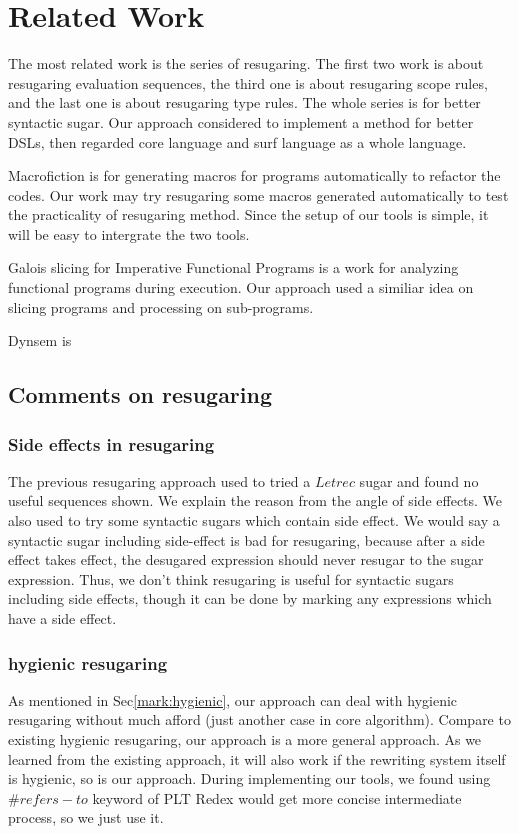 \section{Related Work}
\label{sec5}

The most related work is the series of resugaring\cite{resugaring,hygienic,resugaringtype,resugaringscope}. The first two work is about resugaring evaluation sequences, the third one is about resugaring scope rules, and the last one is about resugaring type rules. The whole series is for better syntactic sugar. Our approach considered to implement a method for better DSLs, then regarded core language and surf language as a whole language.

Macrofiction\cite{Macrofication} is for generating macros for programs automatically to refactor the codes. Our work may try resugaring some macros generated automatically to test the practicality of resugaring method. Since the setup of our tools is simple, it will be easy to intergrate the two tools.

Galois slicing for Imperative Functional Programs\cite{slicing} is a work for analyzing functional programs during execution. Our approach used a similiar idea on slicing programs and processing on sub-programs.

Dynsem\cite{dynsem} is 

\subsection{Comments on resugaring}

\subsubsection{Side effects in resugaring}
\label{mark:side}
The previous resugaring approach used to tried a $Letrec$ sugar and found no useful sequences shown. We explain the reason from the angle of side effects. We also used to try some syntactic sugars which contain side effect. We would say a syntactic sugar including side-effect is bad for resugaring, because after a side effect takes effect, the desugared expression should never resugar to the sugar expression. Thus, we don't think resugaring is useful for syntactic sugars  including side effects, though it can be done by marking any expressions which have a side effect.

\subsubsection{hygienic resugaring}As mentioned in Sec\ref{mark:hygienic}, our approach can deal with hygienic resugaring without much afford (just another case in core algorithm). Compare to existing hygienic resugaring\cite{hygienic}, our approach is a more general approach. As we learned from the existing approach, it will also work if the rewriting system itself is hygienic, so is our approach. During implementing our tools, we found using $\#refers-to$ keyword of PLT Redex would get more concise intermediate process, so we just use it.

